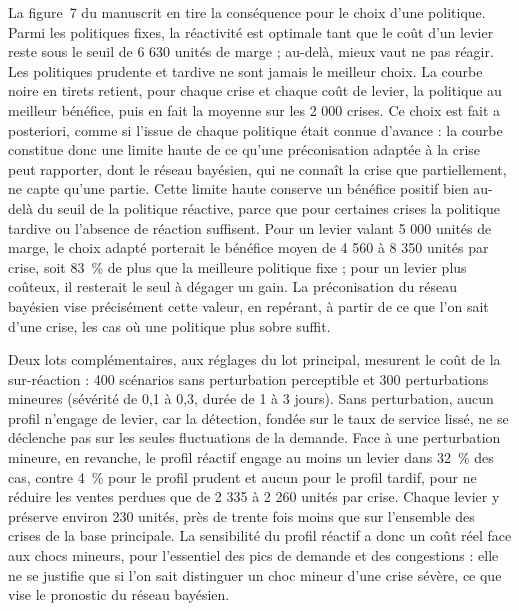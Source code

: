 La figure~7 du manuscrit en tire la conséquence pour le choix d'une politique. Parmi les politiques fixes, la réactivité est optimale tant que le coût d'un levier reste sous le seuil de 6 630 unités de marge ; au-delà, mieux vaut ne pas réagir. Les politiques prudente et tardive ne sont jamais le meilleur choix. La courbe noire en tirets retient, pour chaque crise et chaque coût de levier, la politique au meilleur bénéfice, puis en fait la moyenne sur les 2 000 crises. Ce choix est fait a posteriori, comme si l'issue de chaque politique était connue d'avance : la courbe constitue donc une limite haute de ce qu'une préconisation adaptée à la crise peut rapporter, dont le réseau bayésien, qui ne connaît la crise que partiellement, ne capte qu'une partie. Cette limite haute conserve un bénéfice positif bien au-delà du seuil de la politique réactive, parce que pour certaines crises la politique tardive ou l'absence de réaction suffisent. Pour un levier valant 5 000 unités de marge, le choix adapté porterait le bénéfice moyen de 4 560 à 8 350 unités par crise, soit 83~\% de plus que la meilleure politique fixe ; pour un levier plus coûteux, il resterait le seul à dégager un gain. La préconisation du réseau bayésien vise précisément cette valeur, en repérant, à partir de ce que l'on sait d'une crise, les cas où une politique plus sobre suffit.

Deux lots complémentaires, aux réglages du lot principal, mesurent le coût de la sur-réaction : 400 scénarios sans perturbation perceptible et 300 perturbations mineures (sévérité de 0,1 à 0,3, durée de 1 à 3 jours). Sans perturbation, aucun profil n'engage de levier, car la détection, fondée sur le taux de service lissé, ne se déclenche pas sur les seules fluctuations de la demande. Face à une perturbation mineure, en revanche, le profil réactif engage au moins un levier dans 32~\% des cas, contre 4~\% pour le profil prudent et aucun pour le profil tardif, pour ne réduire les ventes perdues que de 2 335 à 2 260 unités par crise. Chaque levier y préserve environ 230 unités, près de trente fois moins que sur l'ensemble des crises de la base principale. La sensibilité du profil réactif a donc un coût réel face aux chocs mineurs, pour l'essentiel des pics de demande et des congestions : elle ne se justifie que si l'on sait distinguer un choc mineur d'une crise sévère, ce que vise le pronostic du réseau bayésien.
